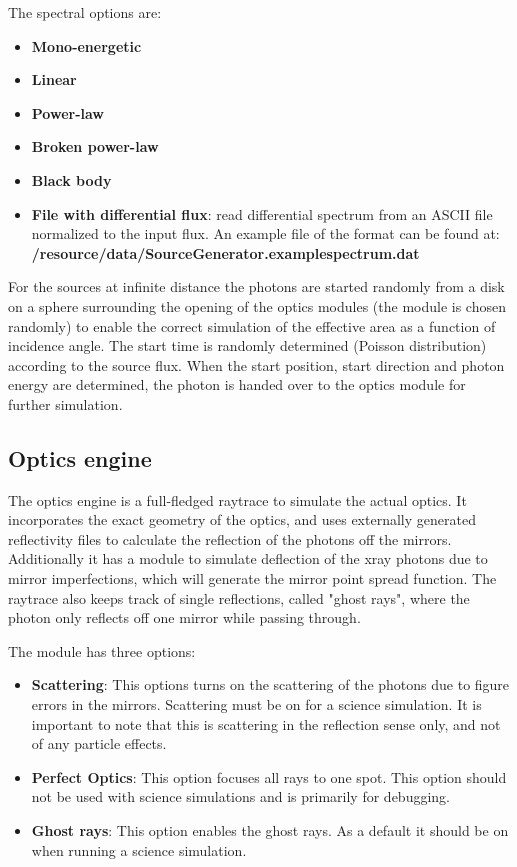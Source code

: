  The spectral options are:
\begin{itemize} 
\item \textbf{Mono-energetic}
\item \textbf{Linear}
\item \textbf{Power-law}
\item \textbf{Broken power-law}
\item \textbf{Black body}
\item \textbf{File with differential flux}: read differential spectrum from an ASCII file normalized to the input flux. An example file of the format can be found at:\\
\textbf{ /resource/data/SourceGenerator.examplespectrum.dat}
\end{itemize}
For the sources at infinite distance the photons are started randomly from a disk on a sphere surrounding the opening of the optics modules (the module is chosen randomly) to enable the correct simulation of the effective area as a function of incidence angle. The start time is randomly determined (Poisson distribution) according to the source flux. When the start position, start direction and photon energy are determined, the photon is handed over to the optics module for further simulation.

\subsection{Optics engine}
The optics engine is a full-fledged raytrace to simulate the actual optics. It incorporates the exact geometry of the optics, and uses externally generated reflectivity files to calculate the reflection of the photons off the mirrors. Additionally it has a module to simulate deflection of the xray photons due to mirror imperfections, which will generate the mirror point spread function. The raytrace also keeps track of single reflections, called "ghost rays", where the photon only reflects off one mirror while passing through.

The module has three options:
\begin{itemize}
\item \textbf{Scattering}: This options turns on the scattering of the photons due to figure errors in the mirrors. Scattering must be on for a science simulation. It is important to note that this is scattering in the reflection sense only, and not of any particle effects.
\item \textbf{Perfect Optics}: This option focuses all rays to one spot. This option should not be used with science simulations and is primarily for debugging.
\item \textbf{Ghost rays}: This option enables the ghost rays. As a default it should be on when running a science simulation. 
\end{itemize}

